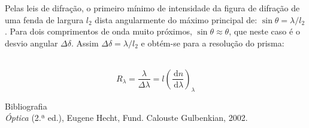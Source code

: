 \documentclass[a4paper,12pt]{article}  %
\newcommand{\ud}{\,\mathrm{d}}
\begin{document}
Pelas leis de difração, o primeiro mínimo de intensidade da figura de difração de uma fenda de largura $l_2$ dista angularmente do máximo principal de:  $\sin \theta = \lambda/l_2$.
Para dois comprimentos de onda muito próximos, $\sin  \theta \approx \theta $, que neste caso é o desvio angular $\Delta \delta$. Assim $\Delta \delta= \lambda / l_2$ e obtém-se para a resolução do prisma: 

~\begin{equation}
	\label{eq:resolup}
	R_\lambda  =  \frac{\lambda}{\Delta \lambda} = l \left(\frac{\ud n}{\ud \lambda} \right )_\lambda 
\end{equation}


\large{Bibliografia}\small\\
\emph{Óptica} (2.ª ed.), Eugene Hecht, Fund. Calouste Gulbenkian, 2002.
\end{document}
